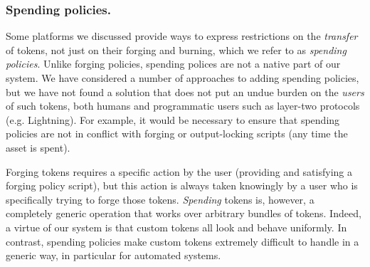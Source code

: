 




\subsubsection{Spending policies.}

Some platforms we discussed provide ways to express restrictions on the \emph{transfer} of
tokens, not just on their forging and burning, which we refer to as \textit{spending policies}.
Unlike forging policies, spending polices are not a native part of our system.
We have considered a number of approaches to adding spending policies, but we
have not found a solution that does not put an undue burden on the \emph{users}
of such tokens, both humans and programmatic users such as layer-two protocols
(e.g. Lightning). For example, it would be necessary to ensure that spending
policies are not in conflict with forging or output-locking scripts (any time the asset is spent).

Forging tokens requires a specific action by the user (providing and satisfying a forging policy script), but this action is always taken knowingly by a user who is specifically trying to forge those tokens.
\emph{Spending} tokens is, however, a completely generic operation that works over arbitrary bundles of tokens.
Indeed, a virtue of our system is that custom tokens all look and behave uniformly.
In contrast, spending policies make custom tokens extremely difficult to handle in a generic way, in particular for automated systems.

